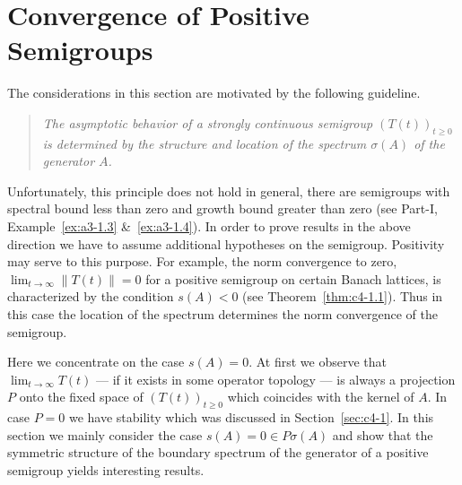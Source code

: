\section{Convergence of Positive Semigroups}\label{sec:c4-2}
%
\hspace{1cm}{\Large by Günther Greiner and Rainer Nagel}
\vspace{.5cm}
\newline
The considerations in this section are motivated by the following guideline.
\begin{quote} 
\textit{The asymptotic behavior of a strongly continuous semigroup $(T(t))_{t \geq 0}$ is determined by the structure and location of the spectrum $\sigma(A)$ of the generator $A$.}
\end{quote}
Unfortunately, this principle does not hold in general, \eg  there are semigroups with spectral bound less than zero and growth bound greater than zero (see Part-I, Example~\ref{ex:a3-1.3} \&~\ref{ex:a3-1.4}).
In order to prove results in the above direction we have to assume additional hypotheses on the semigroup.
Positivity may serve to this purpose.
For example, the norm convergence to zero, \ie  $\lim_{t \to \infty} \|T(t)\| = 0$ for a positive semigroup on certain Banach lattices, is characterized by the condition $s(A) < 0$ (see Theorem~\ref{thm:c4-1.1}).
Thus in this case the location of the spectrum determines the norm convergence of the semigroup.

Here we concentrate on the case $s(A) = 0$.
At first we observe that
$\lim_{t \to \infty} T(t)$ --- if it exists in some operator topology --- is always a projection $P$ onto the fixed space of\/ $(T(t))_{t \geq 0}$ which coincides with the kernel of\/ $A$.
In case $P = 0$ we have stability which was discussed in Section~\ref{sec:c4-1}.
In this section we mainly consider the case $s(A) = 0 \in P{\sigma}(A)$ and show that the symmetric structure of the boundary spectrum of the generator of a positive semigroup yields interesting results.

